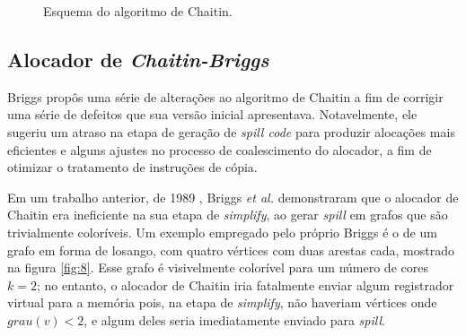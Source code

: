 \documentclass[
	12pt,				%
	openright,			%
	oneside,			%
	a4paper,			%
	tccpreliminar,			%
	]{ABNT-DC-UEL}
\begin{document}
\begin{figure}
    \centering
    \caption{Esquema do algoritmo de Chaitin.}
    \label{fig:6}
\end{figure}

\subsection{Alocador de \textit{Chaitin-Briggs}}

Briggs \cite{briggs:92} propôs uma série de alterações ao algoritmo de Chaitin a fim de corrigir uma série de defeitos que sua versão inicial apresentava. Notavelmente, ele sugeriu um atraso na etapa de geração de \textit{spill code} para produzir alocações mais eficientes e alguns ajustes no processo de coalescimento do alocador, a fim de otimizar o tratamento de instruções de cópia.

Em um trabalho anterior, de 1989 \cite{briggs:89}, Briggs \textit{et al.} demonstraram que o alocador de Chaitin era ineficiente na sua etapa de \textit{simplify}, ao gerar \textit{spill} em grafos que são trivialmente coloríveis. Um exemplo empregado pelo próprio Briggs é o de um grafo em forma de losango, com quatro vértices com duas arestas cada, mostrado na figura \ref{fig:8}. Esse grafo é visivelmente colorível para um número de cores $k=2$; no entanto, o alocador de Chaitin iria fatalmente enviar algum registrador virtual para a memória pois, na etapa de \textit{simplify}, não haveriam vértices onde $grau(v)<2$, e algum deles seria imediatamente enviado para \textit{spill}.
\end{document}
